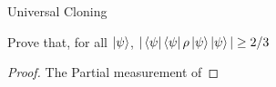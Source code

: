 \begin{solution}{Universal Cloning}\label{ques:x}
    \begin{question}
    Prove that, for all $\ket{\psi}$, $|\bra{\psi}\bra{\psi}\rho\ket{\psi}\ket{\psi}|\geq 2/3$
    \end{question}
    \tcblower{}
    \begin{proof}

    The Partial measurement of 
    \end{proof}
\end{solution}
 